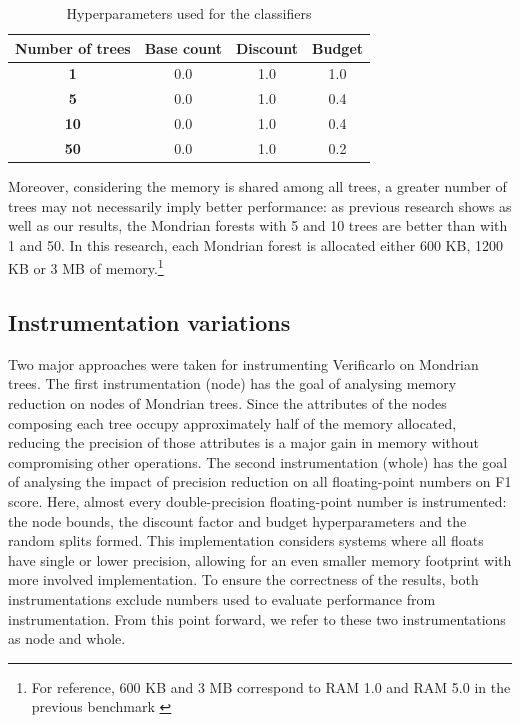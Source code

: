 \documentclass[conference]{IEEEtran}
\begin{document}
\begin{table}[htbp]
    \caption{Hyperparameters used for the classifiers}
    \begin{center}
        \begin{tabular}{|c|c|c|c|}
            \hline
            \textbf{Number of trees} & \textbf{Base count} & \textbf{Discount} &
            \textbf{Budget}                                                          \\
            \hline
            \textbf{1}               & 0.0                 & 1.0               & 1.0 \\
            \textbf{5}               & 0.0                 & 1.0               & 0.4 \\
            \textbf{10}              & 0.0                 & 1.0               & 0.4 \\
            \textbf{50}              & 0.0                 & 1.0               & 0.2 \\
            \hline
        \end{tabular}
        \label{tab1}
    \end{center}
\end{table}

Moreover, considering the memory is shared among all trees, a greater number of
trees may not necessarily imply better performance: as previous research
\cite{khannouz2020benchmark} shows as well as our results, the Mondrian forests
with 5 and 10 trees are better than with 1 and 50. In this research, each
Mondrian forest is allocated either 600 KB, 1200 KB or 3 MB of
memory.\footnote{For reference, 600 KB and 3 MB correspond to RAM 1.0 and RAM
    5.0 in the previous benchmark \cite{khannouz2020benchmark}}

\subsection{Instrumentation variations}

Two major approaches were taken for instrumenting Verificarlo on Mondrian trees.
The first instrumentation (node) has the goal of analysing memory reduction on
nodes of Mondrian trees. Since the attributes of the nodes composing each tree
occupy approximately half of the memory allocated, reducing the precision of
those attributes is a major gain in memory without compromising other
operations. The second instrumentation (whole) has the goal of analysing the
impact of precision reduction on all floating-point numbers on F1 score. Here,
almost every double-precision floating-point number is instrumented: the node
bounds, the discount factor and budget hyperparameters and the random splits
formed. This implementation considers systems where all floats have single or
lower precision, allowing for an even smaller memory footprint with more
involved implementation. To ensure the correctness of the results, both
instrumentations exclude numbers used to evaluate performance from
instrumentation. From this point forward, we refer to these two instrumentations
as node and whole.
\end{document}
